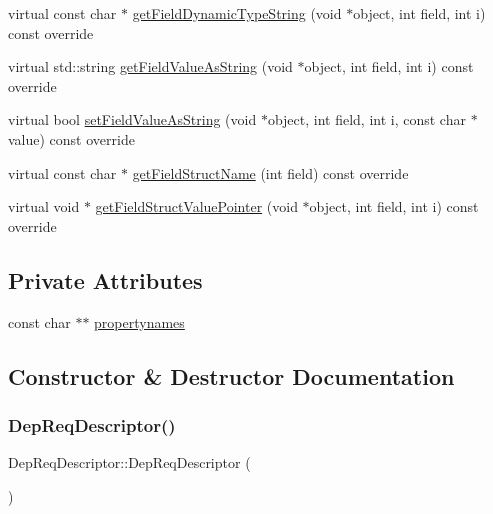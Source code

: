 \begin{DoxyCompactItemize}
\item 
virtual const char $\ast$ \hyperlink{class_dep_req_descriptor_a734079401bce70ebe9dd48ebf997c8f1}{get\+Field\+Dynamic\+Type\+String} (void $\ast$object, int field, int i) const override
\item 
virtual std\+::string \hyperlink{class_dep_req_descriptor_a40708b1630241458821cbfce1e4dd79e}{get\+Field\+Value\+As\+String} (void $\ast$object, int field, int i) const override
\item 
virtual bool \hyperlink{class_dep_req_descriptor_af11c27d9903fc2d076855c9e1feda41b}{set\+Field\+Value\+As\+String} (void $\ast$object, int field, int i, const char $\ast$value) const override
\item 
virtual const char $\ast$ \hyperlink{class_dep_req_descriptor_acba71c972a19a687da42bb2c07baca42}{get\+Field\+Struct\+Name} (int field) const override
\item 
virtual void $\ast$ \hyperlink{class_dep_req_descriptor_a9022933bea91f71f62d6dc8befb94310}{get\+Field\+Struct\+Value\+Pointer} (void $\ast$object, int field, int i) const override
\end{DoxyCompactItemize}
\subsection*{Private Attributes}
\begin{DoxyCompactItemize}
\item 
const char $\ast$$\ast$ \hyperlink{class_dep_req_descriptor_a0d724047f7da4672219cb81300cfbdd4}{propertynames}
\end{DoxyCompactItemize}


\subsection{Constructor \& Destructor Documentation}
\mbox{\label{class_dep_req_descriptor_acc9a0e0eef48f3a21fc8ac17d63bf10a}} 
\subsubsection{\texorpdfstring{Dep\+Req\+Descriptor()}{DepReqDescriptor()}}
{\footnotesize\ttfamily Dep\+Req\+Descriptor\+::\+Dep\+Req\+Descriptor (\begin{DoxyParamCaption}{ }\end{DoxyParamCaption})}

